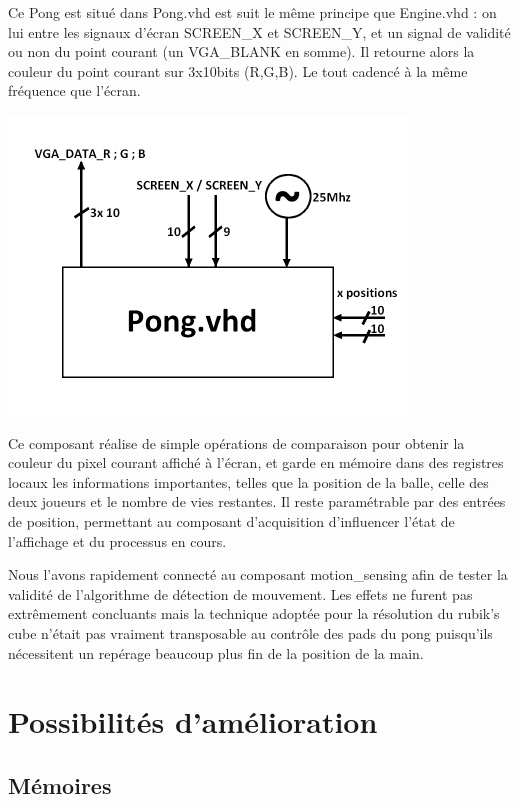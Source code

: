 \documentclass[10pt,a4paper]{report}
\begin{document}
Ce Pong est situé dans Pong.vhd est suit le même principe que Engine.vhd : on lui entre les signaux d'écran SCREEN\_X et SCREEN\_Y, et un signal de validité ou non du point courant (un VGA\_BLANK en somme). Il retourne alors la couleur du point courant sur 3x10bits (R,G,B). Le tout cadencé à la même fréquence que l'écran.

\begin{center}
\includegraphics[width=300pt]{gfx/pong.png}
\end{center}

Ce composant réalise de simple opérations de comparaison pour obtenir la couleur du pixel courant affiché à l'écran, et garde en mémoire dans des registres locaux les informations importantes, telles que la position de la balle, celle des deux joueurs et le nombre de vies restantes. Il reste paramétrable par des entrées de position, permettant au composant d'acquisition d'influencer l'état de l'affichage et du processus en cours.

Nous l'avons rapidement connecté au composant motion\_sensing afin de tester la validité de l'algorithme de détection de mouvement. Les effets ne furent pas extrêmement concluants mais la technique adoptée pour la résolution du rubik's cube n'était pas vraiment transposable au contrôle des pads du pong puisqu'ils nécessitent un repérage beaucoup plus fin de la position de la main. 

\chapter{Possibilités d'amélioration}

\section{Mémoires}
\end{document}
